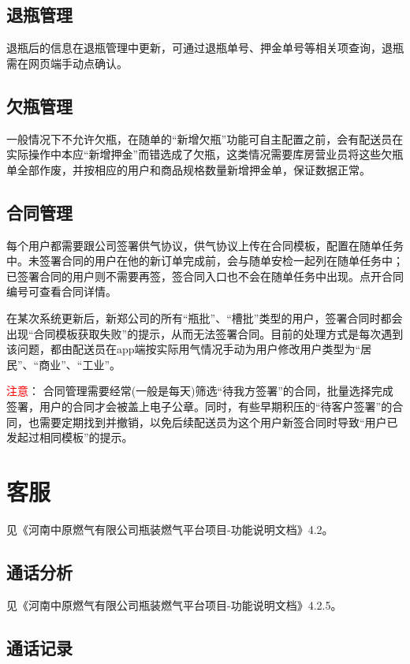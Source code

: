 \documentclass[UTF8]{ctexart}
\begin{document}
\subsection{退瓶管理}

退瓶后的信息在退瓶管理中更新，可通过退瓶单号、押金单号等相关项查询，退瓶需在网页端手动点确认。

\subsection{欠瓶管理}

一般情况下不允许欠瓶，在随单的“新增欠瓶”功能可自主配置之前，会有配送员在实际操作中本应“新增押金”而错选成了欠瓶，这类情况需要库房营业员将这些欠瓶单全部作废，并按相应的用户和商品规格数量新增押金单，保证数据正常。

\subsection{合同管理}

每个用户都需要跟公司签署供气协议，供气协议上传在合同模板，配置在随单任务中。未签署合同的用户在他的新订单完成前，会与随单安检一起列在随单任务中；已签署合同的用户则不需要再签，签合同入口也不会在随单任务中出现。点开合同编号可查看合同详情。

在某次系统更新后，新郑公司的所有“瓶批”、“槽批”类型的用户，签署合同时都会出现“合同模板获取失败”的提示，从而无法签署合同。目前的处理方式是每次遇到该问题，都由配送员在app端按实际用气情况手动为用户修改用户类型为“居民”、“商业”、“工业”。

\textcolor{red}{注意}：
合同管理需要经常(一般是每天)筛选“待我方签署”的合同，批量选择完成签署，用户的合同才会被盖上电子公章。同时，有些早期积压的“待客户签署”的合同，也需要定期找到并撤销，以免后续配送员为这个用户新签合同时导致“用户已发起过相同模板”的提示。



\section{客服}

见《河南中原燃气有限公司瓶装燃气平台项目-功能说明文档》4.2。

\subsection{通话分析}

见《河南中原燃气有限公司瓶装燃气平台项目-功能说明文档》4.2.5。


\subsection{通话记录}
\end{document}
